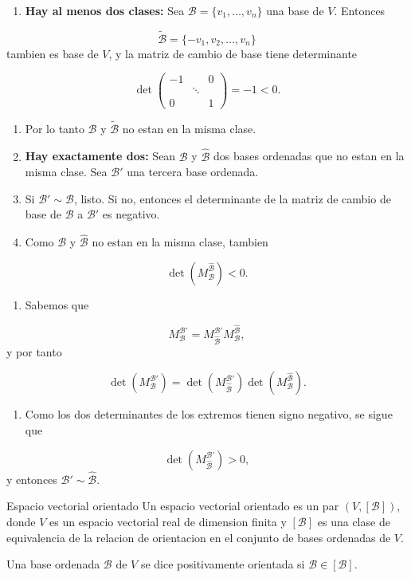 \begin{bookproof}{}
\begin{enumerate}
\item \textbf{Hay al menos dos clases:} Sea $\mathcal B=\{v_1,\ldots,v_n\}$ una base de $V$. Entonces
\end{enumerate}
\[
\widetilde{\mathcal B}=\{-v_1,v_2,\ldots,v_n\}
\]
tambien es base de $V$, y la matriz de cambio de base tiene determinante

\[
\det\begin{pmatrix}-1& &0\\&\ddots&\\0& &1\end{pmatrix}=-1<0.
\]
\begin{enumerate}[start=2]
\item Por lo tanto $\mathcal B$ y $\widetilde{\mathcal B}$ no estan en la misma clase.
\item \textbf{Hay exactamente dos:} Sean $\mathcal B$ y $\widehat{\mathcal B}$ dos bases ordenadas que no estan en la misma clase. Sea $\mathcal B'$ una tercera base ordenada.
\item Si $\mathcal B'\sim\mathcal B$, listo. Si no, entonces el determinante de la matriz de cambio de base de $\mathcal B$ a $\mathcal B'$ es negativo.
\item Como $\mathcal B$ y $\widehat{\mathcal B}$ no estan en la misma clase, tambien
\end{enumerate}
\[
\det\left(M_{\mathcal B}^{\widehat{\mathcal B}}\right)<0.
\]
\begin{enumerate}[start=6]
\item Sabemos que
\end{enumerate}
\[
M_{\mathcal B}^{\mathcal B'}=M_{\widehat{\mathcal B}}^{\mathcal B'}M_{\mathcal B}^{\widehat{\mathcal B}},
\]
y por tanto

\[
\det\left(M_{\mathcal B}^{\mathcal B'}\right) =\det\left(M_{\widehat{\mathcal B}}^{\mathcal B'}\right)\det\left(M_{\mathcal B}^{\widehat{\mathcal B}}\right).
\]
\begin{enumerate}[start=7]
\item Como los dos determinantes de los extremos tienen signo negativo, se sigue que
\end{enumerate}
\[
\det\left(M_{\widehat{\mathcal B}}^{\mathcal B'}\right)>0,
\]
y entonces $\mathcal B'\sim\widehat{\mathcal B}$.

\bookqed
\end{bookproof}
\begin{bookdefinition}{Espacio vectorial orientado}
Un espacio vectorial orientado es un par $(V,[\mathcal B])$, donde $V$ es un espacio vectorial real de dimension finita y $[\mathcal B]$ es una clase de equivalencia de la relacion de orientacion en el conjunto de bases ordenadas de $V$.

Una base ordenada $\mathcal B$ de $V$ se dice positivamente orientada si $\mathcal B\in[\mathcal B]$.

\end{bookdefinition}
